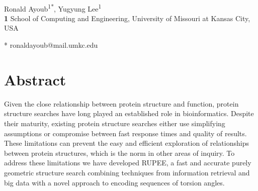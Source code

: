 \documentclass[10pt,letterpaper]{article}
\begin{document}
\vspace*{0.2in}

\begin{flushleft}
{\Large
\textbf{} %
}
\newline
\\
Ronald Ayoub\textsuperscript{1*},
Yugyung Lee\textsuperscript{1}
\\
\bigskip
\textbf{1} School of Computing and Engineering, University of Missouri at Kansas City, USA
\\
\bigskip

% 
%





* ronaldayoub@mail.umkc.edu

\end{flushleft}
\section*{Abstract}
Given the close relationship between protein structure and function, protein structure searches have long played an established role in bioinformatics. 
Despite their maturity, existing protein structure searches either use simplifying assumptions or compromise between fast response times and quality of results. 
These limitations can prevent the easy and efficient exploration of relationships between protein structures, which is the norm in other areas of inquiry.
To address these limitations we have developed RUPEE, a fast and accurate purely geometric structure search combining techniques from information retrieval and big data with a novel approach to encoding sequences of torsion angles.
    
\end{document}
